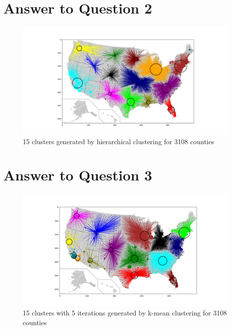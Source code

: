 \documentclass[a4paper]{article}
\begin{document}
\newpage
\section*{Answer to Question 2}

\FloatBarrier
\begin{figure}[h]
	\centering 
	\includegraphics[scale = 0.5, clip=True, trim=5.5cm 1.5cm 0cm 2.5cm]{Q2_hierarchical.png}
	\caption{15 clusters generated by hierarchical clustering for 3108 counties}
\end{figure}
\FloatBarrier


\section*{Answer to Question 3}

\FloatBarrier
\begin{figure}[h]
	\centering 
	\includegraphics[scale = 0.5, clip=True, trim=5.5cm 1.5cm 0cm 2.5cm]{Q3_clustering_k_mean.png}
	\caption{15 clusters with 5 iterations generated by k-mean clustering for 3108 counties}
\end{figure}
\FloatBarrier
\end{document}
